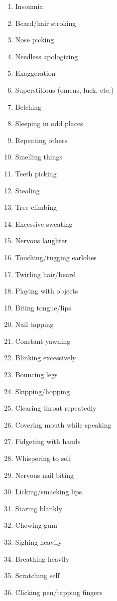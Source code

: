 \documentclass[12pt]{book}  %
\begin{document}
\begin{multicols}{2}
\begin{enumerate}
        \item Insomnia
        \item Beard/hair stroking
        \item Nose picking
        \item Needless apologizing
        \item Exaggeration
        \item Superstitious (omens, luck, etc.)
        \item Belching
        \item Sleeping in odd places
        \item Repeating others
        \item Smelling things
        \item Teeth picking
        \item Stealing
        \item Tree climbing
        \item Excessive sweating
        \item Nervous laughter
        \item Touching/tugging earlobes
        \item Twirling hair/beard
        \item Playing with objects
        \item Biting tongue/lips
        \item Nail tapping
        \item Constant yawning
        \item Blinking excessively
        \item Bouncing legs
        \item Skipping/hopping
        \item Clearing throat repeatedly
        \item Covering mouth while speaking
        \item Fidgeting with hands
        \item Whispering to self
        \item Nervous nail biting
        \item Licking/smacking lips
        \item Staring blankly
        \item Chewing gum
        \item Sighing heavily
        \item Breathing heavily
        \item Scratching self
        \item Clicking pen/tapping fingers

\end{enumerate}
\end{multicols}
\end{document}

